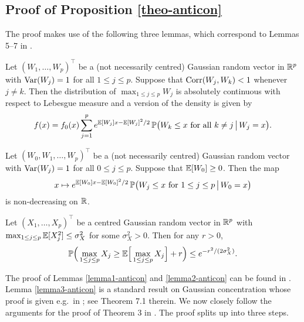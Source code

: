 \newpage
\subsection*{Proof of Proposition \ref{theo-anticon}}

 
The proof makes use of the following three lemmas, which correspond to Lemmas 5--7 in \cite{Chernozhukov2015}. 
\begin{lemmaA}\label{lemma1-anticon}
Let $(W_1,\ldots,W_p)^\top$ be a (not necessarily centred) Gaussian random vector in $\mathbb{R}^p$ with $\textnormal{Var}(W_j) = 1$ for all $1 \le j \le p$. Suppose that $\textnormal{Corr}(W_j,W_k) < 1$ whenever $j \ne k$. Then the distribution of $\max_{1 \le j \le p} W_j$ is absolutely continuous with respect to Lebesgue measure and a version of the density is given by 
\[ f(x) = f_0(x) \sum\limits_{j=1}^p e^{\mathbb{E}[W_j]x - \mathbb{E}[W_j]^2/2} \, \mathbb{P} \big(W_k \le x \text{ for all } k \ne j \, \big| \, W_j = x \big). \]
\end{lemmaA}
\begin{lemmaA}\label{lemma2-anticon}
Let $(W_0,W_1,\ldots,W_p)^\top$ be a (not necessarily centred) Gaussian random vector with $\textnormal{Var}(W_j) = 1$ for all $0 \le j \le p$. Suppose that $\mathbb{E}[W_0] \ge 0$. Then the map 
\[ x \mapsto  e^{\mathbb{E}[W_0]x - \mathbb{E}[W_0]^2/2} \, \mathbb{P} \big(W_j \le x \text{ for } 1 \le j \le p \, \big| \, W_0 = x \big) \]
is non-decreasing on $\mathbb{R}$. 
\end{lemmaA}
\begin{lemmaA}\label{lemma3-anticon}
Let $(X_1,\ldots,X_p)^\top$ be a centred Gaussian random vector in $\mathbb{R}^p$ with $\max_{1 \le j \le p} \mathbb{E}[X_j^2] \le \sigma_X^2$ for some $\sigma_X^2 > 0$. Then for any $r > 0$, 
\[ \mathbb{P} \Big( \max_{1 \le j \le p} X_j \ge \mathbb{E} \Big[ \max_{1 \le j \le p} X_j \Big] + r \Big) \le e^{-r^2/(2\sigma_X^2)}. \]
\end{lemmaA} 
The proof of Lemmas \ref{lemma1-anticon} and \ref{lemma2-anticon} can be found in \cite{Chernozhukov2015}. Lemma \ref{lemma3-anticon} is a standard result on Gaussian concentration whose proof is given e.g.\ in \cite{Ledoux2001}; see Theorem 7.1 therein. We now closely follow the arguments for the proof of Theorem 3 in \cite{Chernozhukov2015}. The proof splits up into three steps. 
\vspace{7pt}


